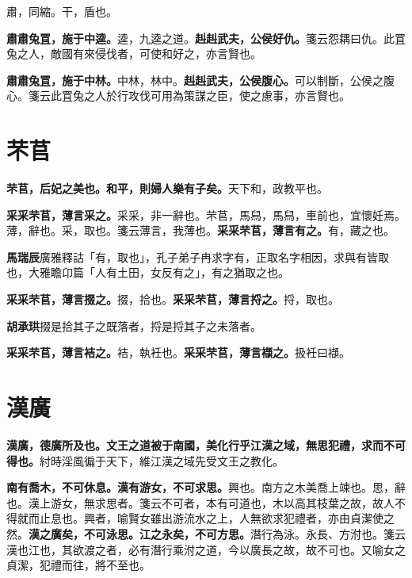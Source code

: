 \begin{quoting}肅，同縮。干，盾也。\end{quoting}

\textbf{肅肅兔罝，施于中逵。}{\footnotesize 逵，九逵之道。}\textbf{赳赳武夫，公侯好仇。}{\footnotesize 箋云怨耦曰仇。此罝兔之人，敵國有來侵伐者，可使和好之，亦言賢也。}

\textbf{肅肅兔罝，施于中林。}{\footnotesize 中林，林中。}\textbf{赳赳武夫，公侯腹心。}{\footnotesize 可以制斷，公侯之腹心。箋云此罝兔之人於行攻伐可用為策謀之臣，使之慮事，亦言賢也。}

\section{芣苢}


\textbf{芣苢，后妃之美也。和平，則婦人樂有子矣。}{\footnotesize 天下和，政教平也。}

\textbf{采采芣苢，薄言采之。}{\footnotesize 采采，非一辭也。芣苢，馬舄，馬舄，車前也，宜懷妊焉。薄，辭也。采，取也。箋云薄言，我薄也。}\textbf{采采芣苢，薄言有之。}{\footnotesize 有，藏之也。}

\begin{quoting}\textbf{馬瑞辰}廣雅釋詁「有，取也」，孔子弟子冉求字有，正取名字相因，求與有皆取也，大雅瞻卬篇「人有土田，女反有之」，有之猶取之也。\end{quoting}

\textbf{采采芣苢，薄言掇之。}{\footnotesize 掇，拾也。}\textbf{采采芣苢，薄言捋之。}{\footnotesize 捋，取也。}

\begin{quoting}\textbf{胡承珙}掇是拾其子之既落者，捋是捋其子之未落者。\end{quoting}

\textbf{采采芣苢，薄言袺之。}{\footnotesize 袺，執衽也。}\textbf{采采芣苢，薄言襭之。}{\footnotesize 扱衽曰襭。}

\section{漢廣}


\textbf{漢廣，德廣所及也。文王之道被于南國，美化行乎江漢之域，無思犯禮，求而不可得也。}{\footnotesize 紂時淫風徧于天下，維江漢之域先受文王之教化。}

\textbf{南有喬木，不可休息。漢有游女，不可求思。}{\footnotesize 興也。南方之木美喬上竦也。思，辭也。漢上游女，無求思者。箋云不可者，本有可道也，木以高其枝葉之故，故人不得就而止息也。興者，喻賢女雖出游流水之上，人無欲求犯禮者，亦由貞潔使之然。}\textbf{漢之廣矣，不可泳思。江之永矣，不可方思。}{\footnotesize 潛行為泳。永長、方泭也。箋云漢也江也，其欲渡之者，必有潛行乘泭之道，今以廣長之故，故不可也。又喻女之貞潔，犯禮而往，將不至也。}

